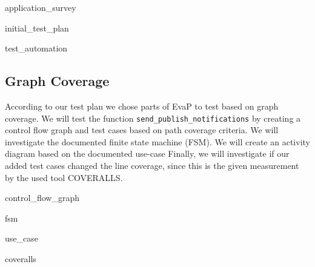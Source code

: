 {application_survey}

{initial_test_plan}

{test_automation}

\subsection{Graph Coverage}
According to our test plan we chose parts of EvaP to test based on graph coverage. 
We will test the function \texttt{send\_publish\_notifications} by creating a control flow graph and test cases based on path coverage criteria. 
We will investigate the documented finite state machine (FSM). 
We will create an activity diagram based on the documented use-case %
Finally, we will investigate if our added test cases changed the line coverage, since this is the given measurement by the used tool COVERALLS.

{control_flow_graph}

{fsm}

{use_case}

{coveralls}
